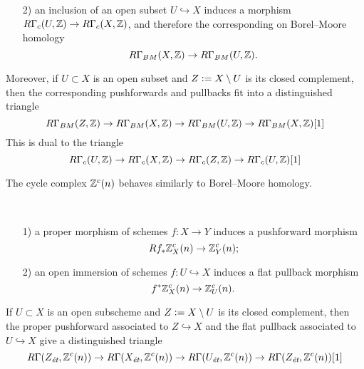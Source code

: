 \begin{nameless}
\begin{enumerate}
  \item[2)] an inclusion of an open subset $U\hookrightarrow X$ induces a
    morphism $R\Gamma_c (U,\mathbb{Z}) \to R\Gamma_c (X,\mathbb{Z})$, and therefore the
    corresponding  on Borel--Moore homology
    $$R\Gamma_{BM} (X, \mathbb{Z}) \to R\Gamma_{BM} (U, \mathbb{Z}).$$
  \end{enumerate}

  Moreover, if $U \subset X$ is an open subset and $Z \mathrel{\mathop:}= X\setminus U$ is its
  closed complement, then the corresponding pushforwards and pullbacks fit into a
  distinguished triangle
  \[ R\Gamma_{BM} (Z, \mathbb{Z}) \to
    R\Gamma_{BM} (X, \mathbb{Z}) \to
    R\Gamma_{BM} (U, \mathbb{Z}) \to
    R\Gamma_{BM} (X, \mathbb{Z}) [1] \]
  This is dual to the triangle
  \[ R\Gamma_c (U, \mathbb{Z}) \to
    R\Gamma_c (X, \mathbb{Z}) \to
    R\Gamma_c (Z, \mathbb{Z}) \to
    R\Gamma_c (U, \mathbb{Z}) [1] \]
\end{nameless}

The cycle complex $\mathbb{Z}^c (n)$ behaves similarly to Borel--Moore homology.

\begin{fact}
  \label{fact:Zc-Borel-Moore} ~

  \begin{enumerate}
  \item[1)] a proper morphism of schemes $f\colon X\to Y$ induces a pushforward
    morphism
    $$Rf_*\mathbb{Z}^c_X (n) \to \mathbb{Z}^c_Y (n);$$

  \item[2)] an open immersion of schemes $f\colon U\hookrightarrow X$ induces a
    flat pullback morphism
    $$f^* \mathbb{Z}^c_X (n) \to \mathbb{Z}^c_U (n).$$
  \end{enumerate}

  If $U\subset X$ is an open subscheme and $Z\mathrel{\mathop:}= X\setminus U$ is its closed
  complement, then the proper pushforward associated to $Z \hookrightarrow X$ and
  the flat pullback associated to $U \hookrightarrow X$ give a distinguished
  triangle
  \[ R\Gamma (Z_\text{\it ét}, \mathbb{Z}^c (n)) \to
    R\Gamma (X_\text{\it ét}, \mathbb{Z}^c (n)) \to
    R\Gamma (U_\text{\it ét}, \mathbb{Z}^c (n)) \to
    R\Gamma (Z_\text{\it ét}, \mathbb{Z}^c (n)) [1] \]
\end{fact}
